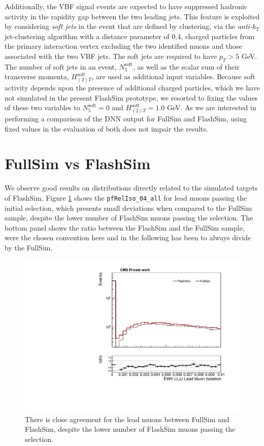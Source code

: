 Additionally, the VBF signal events are expected to have suppressed hadronic activity in the rapidity gap between the two leading jets. This feature is exploited by considering \emph{soft jets} in the event that are defined by clustering, via the \emph{anti-}$k_T$ jet-clustering algorithm with a distance parameter of 0.4, charged particles from the primary interaction vertex excluding the two identified muons and those associated with the two VBF jets. The soft jets are required to have $p_T>5$ GeV. The number of soft jets in an event, $N^{\text{soft}}_5$, as well as the scalar sum of their transverse momenta, $H^{\text{soft}}_{(2)T}$, are used as additional input variables. 
Because soft activity depends upon the presence of additional charged particles, which we have not simulated in the present FlashSim prototype, we resorted to fixing the values of these two variables to $N^{\text{soft}}_5=0$ and $H^{\text{soft}}_{(2)T}=1.0$ GeV. As we are interested in performing a comparison of the DNN output for FullSim and FlashSim, using fixed values in the evaluation of both does not impair the results.

\section{FullSim vs FlashSim}

We observe good results on distributions directly related to the simulated targets of FlashSim. Figure \ref{fig:selmuonpt} shows the \texttt{pfRelIso\_04\_all} for lead muons passing the initial selection, which presents small deviations when compared to the FullSim sample, despite the lower number of FlashSim muons passing the selection. The bottom panel shows the ratio between the FlashSim and the FullSim sample, were the chosen convention here and in the following has been to always divide by the FullSim.

\begin{figure}
    \centering
    \includegraphics[width=\linewidth]{gfx/ch6/EWK_LLJJ_LeadMuon_pfRelIso04_all___PreSel_log.pdf}
    \caption[Lead muon isolation]{There is close agreement for the lead muons between FullSim and FlashSim, despite the lower number of FlashSim muons passing the selection.}
    \label{fig:selmuonpt}
\end{figure}


